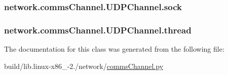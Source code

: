 \subsubsection[{sock}]{\setlength{\rightskip}{0pt plus 5cm}network.\+comms\+Channel.\+U\+D\+P\+Channel.\+sock}\label{classnetwork_1_1commsChannel_1_1UDPChannel_a19e4c1af17dc22d1c378ac53280fe679}
\hypertarget{classnetwork_1_1commsChannel_1_1UDPChannel_a8def8c5020988707811a671264d3b8b7}{}
\subsubsection[{thread}]{\setlength{\rightskip}{0pt plus 5cm}network.\+comms\+Channel.\+U\+D\+P\+Channel.\+thread}\label{classnetwork_1_1commsChannel_1_1UDPChannel_a8def8c5020988707811a671264d3b8b7}


The documentation for this class was generated from the following file\+:\begin{DoxyCompactItemize}
\item 
build/lib.\+linux-\/x86\+\_-\/2./network/\hyperlink{build_2lib_8linux-x86__64-2_87_2network_2commsChannel_8py}{comms\+Channel.\+py}\end{DoxyCompactItemize}
